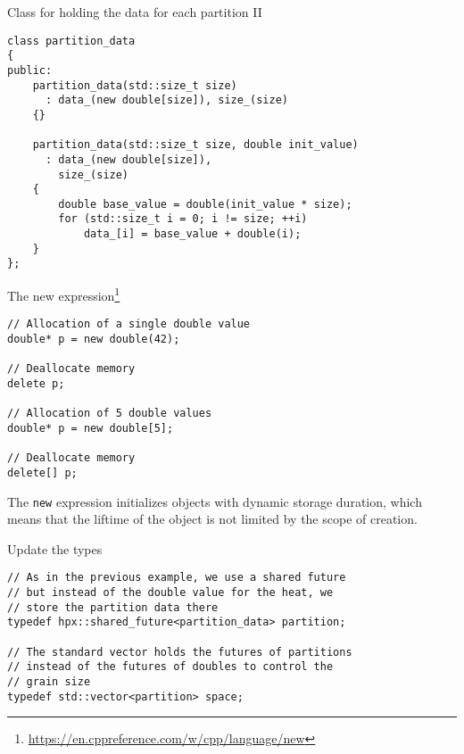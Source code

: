 \documentclass[\classoption]{beamer}
\begin{document}
\begin{frame}[fragile]{Class for holding the data for each partition II}

\begin{lstlisting}
class partition_data
{
public:
    partition_data(std::size_t size)
      : data_(new double[size]), size_(size)
    {}

    partition_data(std::size_t size, double init_value)
      : data_(new double[size]),
        size_(size)
    {
        double base_value = double(init_value * size);
        for (std::size_t i = 0; i != size; ++i)
            data_[i] = base_value + double(i);
    }
};
\end{lstlisting}

\end{frame}

\begin{frame}[fragile]{The new expression\footnote{\tiny\url{https://en.cppreference.com/w/cpp/language/new}}}

\begin{lstlisting}
// Allocation of a single double value 
double* p = new double(42);

// Deallocate memory
delete p;

// Allocation of 5 double values
double* p = new double[5];

// Deallocate memory
delete[] p;

\end{lstlisting}

The \lstinline|new| expression initializes objects with dynamic storage duration, which means that the liftime of the object is not limited by the scope of creation.
\end{frame}


\begin{frame}[fragile]{Update the types}

\begin{lstlisting}
// As in the previous example, we use a shared future
// but instead of the double value for the heat, we
// store the partition data there
typedef hpx::shared_future<partition_data> partition;

// The standard vector holds the futures of partitions
// instead of the futures of doubles to control the
// grain size
typedef std::vector<partition> space;
\end{lstlisting}


\end{frame}

\end{document}

